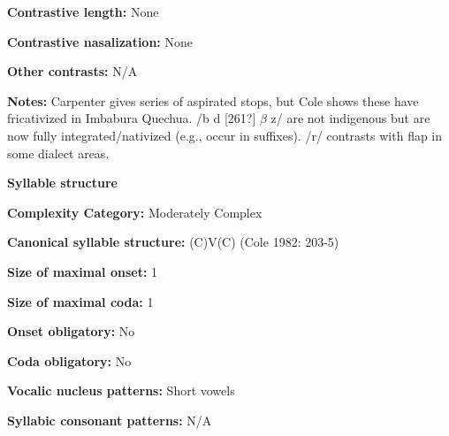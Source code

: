 \begin{styleBody}
\textbf{Contrastive length:} None
\end{styleBody}

\begin{styleBody}
\textbf{Contrastive nasalization:} None
\end{styleBody}

\begin{styleBody}
\textbf{Other contrasts:} N/A
\end{styleBody}

\begin{styleBody}
\textbf{Notes:} Carpenter gives series of aspirated stops, but Cole shows these have fricativized in Imbabura Quechua. /b d [261?] $\beta $ z/ are not indigenous but are now fully integrated/nativized (e.g., occur in suffixes). /r/ contrasts with flap in some dialect areas.
\end{styleBody}

\begin{styleBody}
\textbf{Syllable structure}
\end{styleBody}

\begin{styleBody}
\textbf{Complexity Category:} Moderately Complex
\end{styleBody}

\begin{styleBody}
\textbf{Canonical syllable structure:} (C)V(C)\textbf{ }(Cole 1982: 203-5)
\end{styleBody}

\begin{styleBody}
\textbf{Size of maximal onset:} 1
\end{styleBody}

\begin{styleBody}
\textbf{Size of maximal coda:} 1
\end{styleBody}

\begin{styleBody}
\textbf{Onset obligatory:} No
\end{styleBody}

\begin{styleBody}
\textbf{Coda obligatory:} No
\end{styleBody}

\begin{styleBody}
\textbf{Vocalic nucleus patterns:} Short vowels
\end{styleBody}

\begin{styleBody}
\textbf{Syllabic consonant patterns:} N/A
\end{styleBody}

